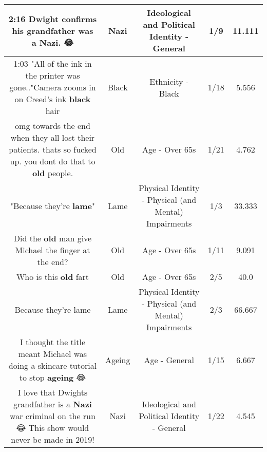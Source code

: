 \documentclass[11pt]{article}
\newlength\mylength
\begin{document}
\begin{center}
\begin{longtable}{|C{.65\mylength}|C{.30\mylength}|C{.12\mylength}|C{.12\mylength}|C{.12\mylength}|}
  \small 2:16 Dwight confirms his grandfather was a \textbf{Nazi}. 😂\normalsize   & Nazi &  Ideological and Political Identity - General & 1/9 & 11.111 \\  \hline
  \small 1:03 "All of the ink in the printer was gone.."Camera zooms in on Creed's ink \textbf{black} hair\normalsize   & Black & Ethnicity - Black & 1/18 & 5.556 \\  \hline
  \small omg towards the end when they all lost their patients. thats so fucked up. you dont do that to \textbf{old} people.\normalsize   & Old & Age - Over 65s & 1/21 & 4.762 \\  \hline
  \small "Because they're \textbf{lame}"\normalsize   & Lame & Physical Identity - Physical (and Mental) Impairments & 1/3 & 33.333 \\  \hline
  \small Did the \textbf{old} man give Michael the finger at the end?\normalsize   & Old & Age - Over 65s & 1/11 & 9.091 \\  \hline
  \small Who is this \textbf{old} fart\normalsize   & Old & Age - Over 65s & 2/5 & 40.0 \\  \hline
  \small Because they're lame\normalsize   & Lame & Physical Identity - Physical (and Mental) Impairments & 2/3 & 66.667 \\  \hline
  \small I thought the title meant Michael was doing a skincare tutorial to stop \textbf{ageing} 😂\normalsize   & Ageing & Age - General & 1/15 & 6.667 \\  \hline
  \small I love that Dwights grandfather is a \textbf{Nazi} war criminal on the run 😂 This show would never be made in 2019!\normalsize   & Nazi &  Ideological and Political Identity - General & 1/22 & 4.545 \\  \hline

\end{longtable}
\end{center}
\end{document}
